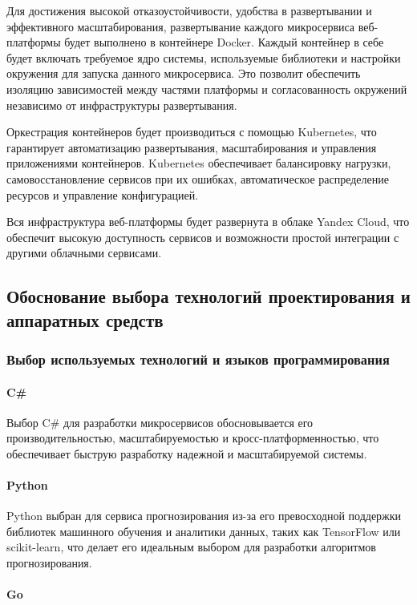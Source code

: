 Для достижения высокой отказоустойчивости, удобства в развертывании и эффективного масштабирования, развертывание каждого микросервиса веб-платформы будет выполнено в контейнере Docker. Каждый контейнер в себе будет включать требуемое ядро системы, используемые библиотеки и настройки окружения для запуска данного микросервиса. Это позволит обеспечить изоляцию зависимостей между частями платформы и согласованность окружений независимо от инфраструктуры развертывания.

Оркестрация контейнеров будет производиться с помощью Kubernetes, что гарантирует автоматизацию развертывания, масштабирования и управления приложениями контейнеров. Kubernetes обеспечивает балансировку нагрузки, самовосстановление сервисов при их ошибках, автоматическое распределение ресурсов и управление конфигурацией.

Вся инфраструктура веб-платформы будет развернута в облаке Yandex Cloud, что обеспечит высокую доступность сервисов и возможности простой интеграции с другими облачными сервисами.

\subsection{Обоснование выбора технологий проектирования и аппаратных средств}
\subsubsection{Выбор используемых технологий и языков программирования}

\paragraph{C\#}

Выбор C\# для разработки микросервисов обосновывается его производительностью, масштабируемостью и кросс-платформенностью, что обеспечивает быструю разработку надежной и масштабируемой системы.

\paragraph{Python}

Python выбран для сервиса прогнозирования из-за его превосходной поддержки библиотек машинного обучения и аналитики данных, таких как TensorFlow или scikit-learn, что делает его идеальным выбором для разработки алгоритмов прогнозирования.

\paragraph{Go}


